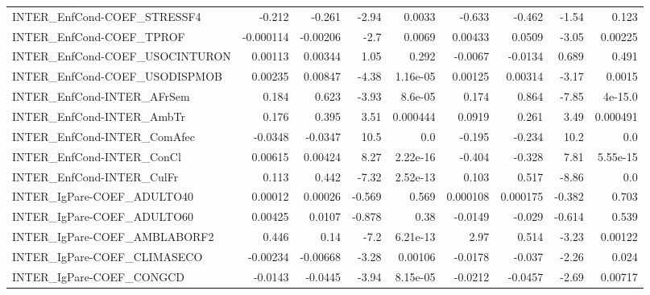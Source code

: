 \begin{tabular}{lrrrrrrrr}
INTER\_EnfCond-COEF\_STRESSF4           &      -0.212 &       -0.261 &    -2.94 &   0.0033 &     -0.633 &      -0.462 &        -1.54 &         0.123 \\
INTER\_EnfCond-COEF\_TPROF              &   -0.000114 &     -0.00206 &     -2.7 &   0.0069 &    0.00433 &      0.0509 &        -3.05 &       0.00225 \\
INTER\_EnfCond-COEF\_USOCINTURON        &     0.00113 &      0.00344 &     1.05 &    0.292 &    -0.0067 &     -0.0134 &        0.689 &         0.491 \\
INTER\_EnfCond-COEF\_USODISPMOB         &     0.00235 &      0.00847 &    -4.38 & 1.16e-05 &    0.00125 &     0.00314 &        -3.17 &        0.0015 \\
INTER\_EnfCond-INTER\_AFrSem            &       0.184 &        0.623 &    -3.93 &  8.6e-05 &      0.174 &       0.864 &        -7.85 &       4e-15.0 \\
INTER\_EnfCond-INTER\_AmbTr             &       0.176 &        0.395 &     3.51 & 0.000444 &     0.0919 &       0.261 &         3.49 &      0.000491 \\
INTER\_EnfCond-INTER\_ComAfec           &     -0.0348 &      -0.0347 &     10.5 &      0.0 &     -0.195 &      -0.234 &         10.2 &           0.0 \\
INTER\_EnfCond-INTER\_ConCl             &     0.00615 &      0.00424 &     8.27 & 2.22e-16 &     -0.404 &      -0.328 &         7.81 &      5.55e-15 \\
INTER\_EnfCond-INTER\_CulFr             &       0.113 &        0.442 &    -7.32 & 2.52e-13 &      0.103 &       0.517 &        -8.86 &           0.0 \\
INTER\_IgPare-COEF\_ADULTO40            &     0.00012 &      0.00026 &   -0.569 &    0.569 &   0.000108 &    0.000175 &       -0.382 &         0.703 \\
INTER\_IgPare-COEF\_ADULTO60            &     0.00425 &       0.0107 &   -0.878 &     0.38 &    -0.0149 &      -0.029 &       -0.614 &         0.539 \\
INTER\_IgPare-COEF\_AMBLABORF2          &       0.446 &         0.14 &     -7.2 & 6.21e-13 &       2.97 &       0.514 &        -3.23 &       0.00122 \\
INTER\_IgPare-COEF\_CLIMASECO           &    -0.00234 &     -0.00668 &    -3.28 &  0.00106 &    -0.0178 &      -0.037 &        -2.26 &         0.024 \\
INTER\_IgPare-COEF\_CONGCD              &     -0.0143 &      -0.0445 &    -3.94 & 8.15e-05 &    -0.0212 &     -0.0457 &        -2.69 &       0.00717 \\

\end{tabular}
